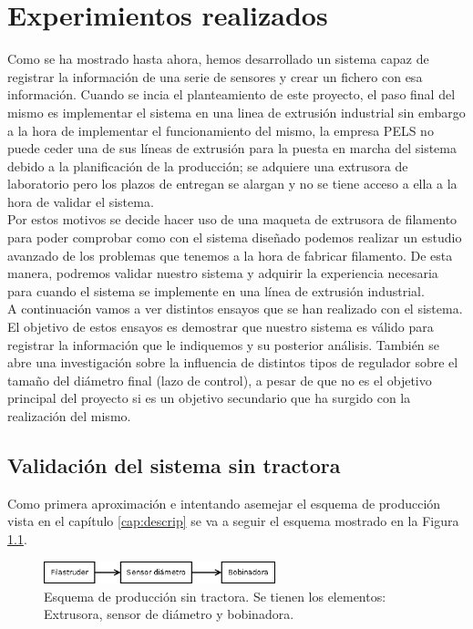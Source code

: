 \chapter{Experimientos realizados}
\label{cap:resultados}

Como se ha mostrado hasta ahora, hemos desarrollado un sistema capaz de registrar la información de una serie de sensores y crear un fichero con esa información. Cuando se incia el planteamiento de este proyecto, el paso final del mismo es implementar el sistema en una linea de extrusión industrial sin embargo a la hora de implementar el funcionamiento del mismo, la empresa PELS no puede ceder una de sus líneas de extrusión para la puesta en marcha del sistema debido a la planificación de la producción; se adquiere una extrusora de laboratorio pero los plazos de entregan se alargan y no se tiene acceso a ella a la hora de validar el sistema.\\

Por estos motivos se decide hacer uso de una maqueta de extrusora de filamento para poder comprobar como con el sistema diseñado podemos realizar un estudio avanzado de los problemas que tenemos a la hora de fabricar filamento. De esta manera, podremos validar nuestro sistema y adquirir la experiencia necesaria para cuando el sistema se implemente en una línea de extrusión industrial. \\

A continuación vamos a ver distintos ensayos que se han realizado con el sistema. El objetivo de estos ensayos es demostrar que nuestro sistema es válido para registrar la información que le indiquemos y su posterior análisis. También se abre una investigación sobre la influencia de distintos tipos de regulador sobre el tamaño del diámetro final (lazo de control), a pesar de que no es el objetivo principal del proyecto si es un objetivo secundario que ha surgido con la realización del mismo.

\section{Validación del sistema sin tractora}
\label{sec:FSB}

Como primera aproximación e intentando asemejar el esquema de producción vista en el capítulo \ref{cap:descrip} se va a seguir el esquema mostrado en la Figura \ref{fig:esquemap_FSB}.

\begin{figure}[H]
    \centering
    \includegraphics[width=0.6\textwidth]{images/producciones/Diagram1.png}
    \caption[Esquema de producción sin tractora.]{Esquema de producción sin tractora. Se tienen los elementos: Extrusora, sensor de diámetro y bobinadora.}
    \label{fig:esquemap_FSB}
\end{figure}

